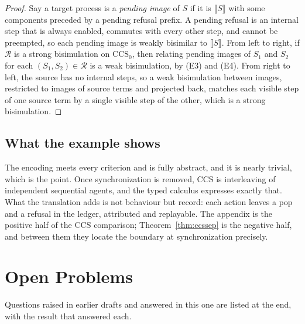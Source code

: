 \documentclass[11pt,openany]{book}
\theoremstyle{remark}
\begin{document}
\begin{proof}
Say a target process is a \emph{pending image} of $S$ if it is
$\llbracket S\rrbracket$ with some components preceded by a pending
refusal prefix. A pending refusal is an internal step that is always
enabled, commutes with every other step, and cannot be preempted, so each
pending image is weakly bisimilar to $\llbracket S\rrbracket$.
From left to right, if $\mathcal R$ is a strong bisimulation on
$\mathrm{CCS}_0$, then relating pending images of $S_1$ and $S_2$ for each
$(S_1,S_2)\in\mathcal R$ is a weak bisimulation, by (E3) and (E4). From
right to left, the source has no internal steps, so a weak bisimulation
between images, restricted to images of source terms and projected back,
matches each visible step of one source term by a single visible step of
the other, which is a strong bisimulation.
\end{proof}

\section{What the example shows}

The encoding meets every criterion and is fully abstract, and it is
nearly trivial, which is the point. Once synchronization is removed, CCS
is interleaving of independent sequential agents, and the typed calculus
expresses exactly that. What the translation adds is not behaviour but
record: each action leaves a pop and a refusal in the ledger, attributed
and replayable. The appendix is the positive half of the CCS comparison;
Theorem~\ref{thm:ccssep} is the negative half, and between them they
locate the boundary at synchronization precisely.

\chapter{Open Problems}
\label{app:open}

Questions raised in earlier drafts and answered in this one are listed
at the end, with the result that answered each.
\end{document}
